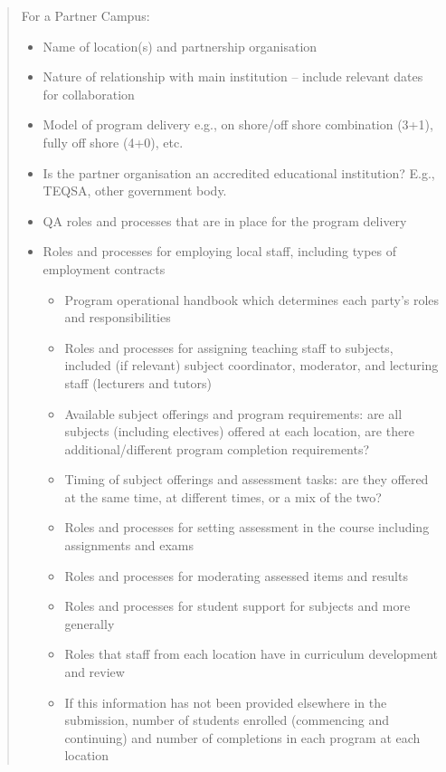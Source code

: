 \begin{quote}
For a Partner Campus:
\begin{itemize}
\item Name of location(s) and partnership organisation
\item Nature of relationship with main institution – include relevant dates for collaboration
\item Model of program delivery e.g., on shore/off shore combination (3+1), fully off shore (4+0), etc.
\item Is the partner organisation an accredited educational institution? E.g., TEQSA, other government body.
\item QA roles and processes that are in place for the program delivery
\item Roles and processes for employing local staff, including types of employment contracts
\begin{itemize}
\item Program operational handbook which determines each party’s roles and responsibilities
\item Roles and processes for assigning teaching staff to subjects, included (if relevant) subject
coordinator, moderator, and lecturing staff (lecturers and tutors)
\item Available subject offerings and program requirements: are all subjects (including electives) offered
at each location, are there additional/different program completion requirements?
\item Timing of subject offerings and assessment tasks: are they offered at the same time, at different
times, or a mix of the two?
\item Roles and processes for setting assessment in the course including assignments and exams
\item  Roles and processes for moderating assessed items and results
\item  Roles and processes for student support for subjects and more generally
\item Roles that staff from each location have in curriculum development and review
\item  If this information has not been provided elsewhere in the submission, number of students enrolled
(commencing and continuing) and number of completions in each program at each location
\end{itemize}
\end{itemize}
\end{quote}


